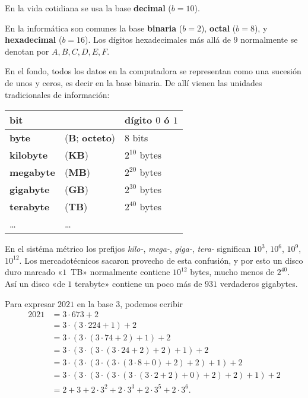 \begin{comentario}
  En la vida cotidiana se usa la base \textbf{decimal} ($b = 10$).

  En la informática son comunes la base \textbf{binaria} ($b = 2$),
  \textbf{octal} ($b = 8$), y \textbf{hexadecimal} ($b = 16$). Los dígitos
  hexadecimales más allá de $9$ normalmente se denotan por $A,B,C,D,E,F$.

  En el fondo, todos los datos en la computadora se representan como una
  sucesión de unos y ceros, es decir en la base binaria. De allí vienen las
  unidades tradicionales de información:


  \begin{center}
    \renewcommand{\arraystretch}{1.5}
    \begin{tabular}{lll}
      \hline
      \textbf{bit} & & dígito $0$ ó $1$ \\
      \hline
      \textbf{byte} & (\textbf{B}; \textbf{octeto}) & $8$ bits \\
      \hline
      \textbf{kilobyte} & (\textbf{KB}) & $2^{10}$ bytes \\
      \hline
      \textbf{megabyte} & (\textbf{MB}) & $2^{20}$ bytes \\
      \hline
      \textbf{gigabyte} & (\textbf{GB}) & $2^{30}$ bytes \\
      \hline
      \textbf{terabyte} & (\textbf{TB}) & $2^{40}$ bytes \\
      \hline
      \dots & \dots
    \end{tabular}
  \end{center}
    En el sistéma métrico los prefijos \emph{kilo-},
    \emph{mega-}, \emph{giga-}, \emph{tera-} significan $10^3$, $10^6$, $10^9$,
    $10^{12}$. Los mercadotécnicos sacaron provecho de esta confusión, y por
    esto un disco duro marcado «$1$~TB» normalmente contiene $10^{12}$ bytes,
    mucho menos de $2^{40}$. Así un disco «de $1$ terabyte» contiene un poco más
    de $931$ verdaderos gigabytes.
\end{comentario}

\begin{ejemplo}
  Para expresar $2021$ en la base $3$, podemos ecribir
  \begin{align*}
    2021 & = 3\cdot 673 + 2 \\
         & = 3\cdot (3\cdot 224 + 1) + 2 \\
         & = 3\cdot (3\cdot (3\cdot 74 + 2) + 1) + 2 \\
         & = 3\cdot (3\cdot (3\cdot (3\cdot 24 + 2) + 2) + 1) + 2 \\
         & = 3\cdot (3\cdot (3\cdot (3\cdot (3\cdot 8 + 0) + 2) + 2) + 1) + 2 \\
         & = 3\cdot (3\cdot (3\cdot (3\cdot (3\cdot (3\cdot \boxed{2} + \boxed{2}) + \boxed{0}) + \boxed{2}) + \boxed{2}) + \boxed{1}) + \boxed{2} \\
         & = 2 + 3 + 2\cdot 3^2 + 2\cdot 3^3 + 2\cdot 3^5 + 2\cdot 3^6.
  \end{align*}
\end{ejemplo}

